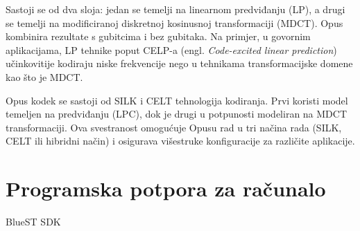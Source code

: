 Sastoji se od dva sloja: jedan se temelji na linearnom predviđanju (LP), a drugi se temelji na modificiranoj diskretnoj kosinusnoj transformaciji (MDCT). Opus kombinira rezultate s gubitcima i bez gubitaka. Na primjer, u govornim aplikacijama, LP tehnike poput CELP-a (engl. \textit{Code-excited linear prediction}) učinkovitije kodiraju niske frekvencije nego u tehnikama transformacijske domene kao što je MDCT.

Opus kodek se sastoji od SILK i CELT tehnologija kodiranja. Prvi koristi model temeljen na predviđanju (LPC), dok je drugi u potpunosti modeliran na MDCT transformaciji. Ova svestranost omogućuje Opusu rad u tri načina rada (SILK, CELT ili hibridni način) i osigurava višestruke konfiguracije za različite aplikacije.

\section{Programska potpora za računalo}
BlueST SDK